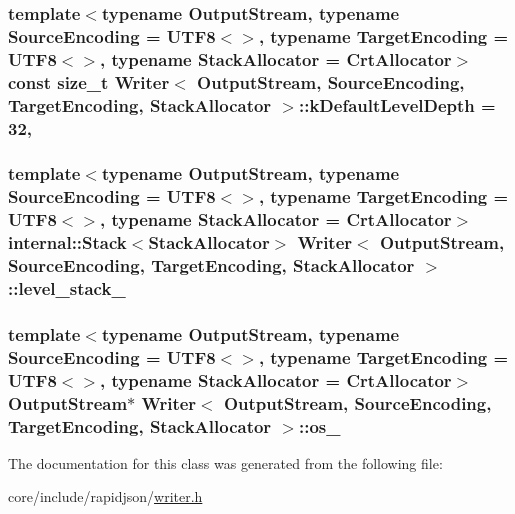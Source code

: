 \subsubsection[{\texorpdfstring{k\+Default\+Level\+Depth}{kDefaultLevelDepth}}]{\setlength{\rightskip}{0pt plus 5cm}template$<$typename Output\+Stream, typename Source\+Encoding = U\+T\+F8$<$$>$, typename Target\+Encoding = U\+T\+F8$<$$>$, typename Stack\+Allocator = Crt\+Allocator$>$ const size\+\_\+t {\bf Writer}$<$ Output\+Stream, Source\+Encoding, Target\+Encoding, Stack\+Allocator $>$\+::k\+Default\+Level\+Depth = 32\hspace{0.3cm}{\ttfamily [static]}, {\ttfamily [protected]}}\hypertarget{classWriter_aad47efc97708b2a64e4a0994cbbfae25}{}\label{classWriter_aad47efc97708b2a64e4a0994cbbfae25}
\subsubsection[{\texorpdfstring{level\+\_\+stack\+\_\+}{level_stack_}}]{\setlength{\rightskip}{0pt plus 5cm}template$<$typename Output\+Stream, typename Source\+Encoding = U\+T\+F8$<$$>$, typename Target\+Encoding = U\+T\+F8$<$$>$, typename Stack\+Allocator = Crt\+Allocator$>$ {\bf internal\+::\+Stack}$<$Stack\+Allocator$>$ {\bf Writer}$<$ Output\+Stream, Source\+Encoding, Target\+Encoding, Stack\+Allocator $>$\+::level\+\_\+stack\+\_\+\hspace{0.3cm}{\ttfamily [protected]}}\hypertarget{classWriter_af179a9f272f80414d48f64ede9ddde12}{}\label{classWriter_af179a9f272f80414d48f64ede9ddde12}
\subsubsection[{\texorpdfstring{os\+\_\+}{os_}}]{\setlength{\rightskip}{0pt plus 5cm}template$<$typename Output\+Stream, typename Source\+Encoding = U\+T\+F8$<$$>$, typename Target\+Encoding = U\+T\+F8$<$$>$, typename Stack\+Allocator = Crt\+Allocator$>$ Output\+Stream$\ast$ {\bf Writer}$<$ Output\+Stream, Source\+Encoding, Target\+Encoding, Stack\+Allocator $>$\+::os\+\_\+\hspace{0.3cm}{\ttfamily [protected]}}\hypertarget{classWriter_a51ba99f008df7bbf32de311aa22b05ae}{}\label{classWriter_a51ba99f008df7bbf32de311aa22b05ae}


The documentation for this class was generated from the following file\+:\begin{DoxyCompactItemize}
\item 
core/include/rapidjson/\hyperlink{writer_8h}{writer.\+h}\end{DoxyCompactItemize}
